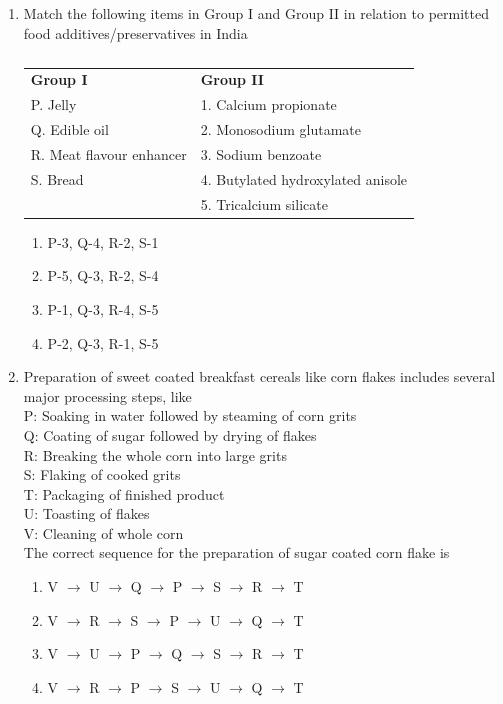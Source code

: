 \documentclass[a4paper,10pt]{article}
\begin{document}
\begin{enumerate}
\item Match the following items in Group I and Group II in relation to permitted food additives/preservatives in India
\begin{table}[H]
\centering
\begin{tabular}{ll}
\textbf{Group I} & \textbf{Group II} \\
P. Jelly & 1. Calcium propionate \\
Q. Edible oil & 2. Monosodium glutamate \\
R. Meat flavour enhancer & 3. Sodium benzoate \\
S. Bread & 4. Butylated hydroxylated anisole \\
 & 5. Tricalcium silicate \\
\end{tabular}
\caption*{}
\label{tab:q14_food}
\end{table}
\hfill{}

\begin{multicols}{2}
\begin{enumerate}
\item P-3, Q-4, R-2, S-1
\item P-5, Q-3, R-2, S-4
\item P-1, Q-3, R-4, S-5
\item P-2, Q-3, R-1, S-5
\end{enumerate}
\end{multicols}

\item Preparation of sweet coated breakfast cereals like corn flakes includes several major processing steps, like \\
P: Soaking in water followed by steaming of corn grits \\
Q: Coating of sugar followed by drying of flakes \\
R: Breaking the whole corn into large grits \\
S: Flaking of cooked grits \\
T: Packaging of finished product \\
U: Toasting of flakes \\
V: Cleaning of whole corn \\
The correct sequence for the preparation of sugar coated corn flake is
\hfill{}

\begin{enumerate}
\item V $\rightarrow$ U $\rightarrow$ Q $\rightarrow$ P $\rightarrow$ S $\rightarrow$ R $\rightarrow$ T
\item V $\rightarrow$ R $\rightarrow$ S $\rightarrow$ P $\rightarrow$ U $\rightarrow$ Q $\rightarrow$ T
\item V $\rightarrow$ U $\rightarrow$ P $\rightarrow$ Q $\rightarrow$ S $\rightarrow$ R $\rightarrow$ T
\item V $\rightarrow$ R $\rightarrow$ P $\rightarrow$ S $\rightarrow$ U $\rightarrow$ Q $\rightarrow$ T
\end{enumerate}


\end{enumerate}
\end{document}
